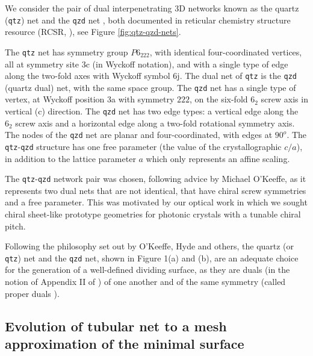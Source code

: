 \documentclass[a4paper]{amsart}
\theoremstyle{plain}
\theoremstyle{definition}
\begin{document}
We consider the pair of dual interpenetrating 3D networks known as the quartz
(\texttt{qtz}) net and the \texttt{qzd} net \cite{DelgadoF_2_2003}, both
documented in reticular chemistry structure resource (RCSR,
\cite{OKeeffe_2008}), see Figure \ref{fig:qtz-qzd-nets}. 

The \texttt{qtz} net has symmetry group $P6_222$, with identical
four-coordinated vertices, all at symmetry site 3c (in Wyckoff notation), and
with a single type of edge along the two-fold axes with Wyckoff symbol 6j. The
dual net of \texttt{qtz} is the \texttt{qzd} (quartz dual) net, with the same
space group. The \texttt{qzd} net has a single type of vertex, at Wyckoff
position 3a with symmetry $222$, on the six-fold $6_2$ screw axis in vertical
(c) direction. The \texttt{qzd} net has two edge types: a vertical edge along
the $6_2$ screw axis and a horizontal edge along a two-fold rotational symmetry
axis. The nodes of the \texttt{qzd} net are planar and four-coordinated, with
edges at $90^o$. The \texttt{qtz}-\texttt{qzd} structure has one free parameter
(the value of the crystallographic $c/a$), in addition to the lattice parameter
$a$ which only represents an affine scaling.

The \texttt{qtz}-\texttt{qzd} network pair was chosen, following advice by
Michael O'Keeffe, as it represents two dual nets that are not identical, that
have chiral screw symmetries and a free parameter. This was motivated by our
optical work in which we sought chiral sheet-like prototype geometries for
photonic crystals with a tunable chiral pitch.  

Following the philosophy set out by O'Keeffe, Hyde and others, the quartz (or
{\texttt{qtz}}) net and the {\texttt{qzd}} net, shown in Figure 1(a) and (b),
are an adequate choice for the generation of a well-defined dividing surface,
as they are duals (in the notion of Appendix II of \cite{Schoen_1970}) of one
another and of the same symmetry (called proper duals \cite{Blatov_2007}). 

\subsection{Evolution of tubular net to a mesh approximation of the minimal surface}
\end{document}
